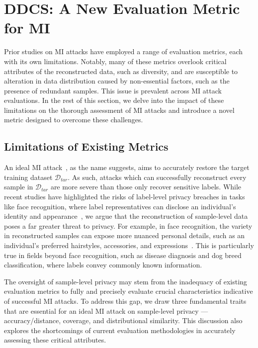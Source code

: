 \section{DDCS: A New Evaluation Metric for MI}
Prior studies on MI attacks have employed a range of evaluation metrics, each with its own limitations.
Notably, many of these metrics overlook critical attributes of the reconstructed data, such as diversity, and are susceptible to alteration in data distribution caused by non-essential factors, such as the presence of redundant samples.
This issue is prevalent across MI attack evaluations.
In the rest of this section, we delve into the impact of these limitations on the thorough assessment of MI attacks and introduce a novel metric designed to overcome these challenges.

\subsection{Limitations of Existing Metrics}
\label{sec:ddcs:limitation}
An ideal MI attack~\cite{vmi21nips}, as the name suggests, aims to accurately restore the target training dataset $\mathcal{D}_{tar}$. As such, attacks which can successfully reconstruct every sample in $\mathcal{D}_{tar}$ are more severe than those only recover sensitive labels.
While recent studies have highlighted the risks of label-level privacy breaches in tasks like face recognition, where label representatives can disclose an individual's identity and appearance~\cite{mirror22ndss}, we argue that the reconstruction of sample-level data poses a far greater threat to privacy.
For example, in face recognition, the variety in reconstructed samples can expose more nuanced personal details, such as an individual's preferred hairstyles, accessories, and expressions~\cite{vmi21nips}.
This is particularly true in fields beyond face recognition, such as disease diagnosis and dog breed classification, where labels convey commonly known information.

The oversight of sample-level privacy may stem from the inadequacy of existing evaluation metrics to fully and precisely evaluate crucial characteristics indicative of successful MI attacks. To address this gap, we draw three fundamental traits that are essential for an ideal MI attack on sample-level privacy --- accuracy/distance, coverage, and distributional similarity. This discussion also explores the shortcomings of current evaluation methodologies in accurately assessing these critical attributes.

